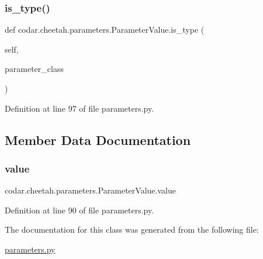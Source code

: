 \subsubsection{\texorpdfstring{is\+\_\+type()}{is\_type()}}
{\footnotesize\ttfamily def codar.\+cheetah.\+parameters.\+Parameter\+Value.\+is\+\_\+type (\begin{DoxyParamCaption}\item[{}]{self,  }\item[{}]{parameter\+\_\+class }\end{DoxyParamCaption})}



Definition at line 97 of file parameters.\+py.



\subsection{Member Data Documentation}
\mbox{\label{classcodar_1_1cheetah_1_1parameters_1_1_parameter_value_a270382b19fffc9efa6dd17119b8e1ba8}} 
\subsubsection{\texorpdfstring{value}{value}}
{\footnotesize\ttfamily codar.\+cheetah.\+parameters.\+Parameter\+Value.\+value}



Definition at line 90 of file parameters.\+py.



The documentation for this class was generated from the following file\+:\begin{DoxyCompactItemize}
\item 
\hyperlink{parameters_8py}{parameters.\+py}\end{DoxyCompactItemize}
